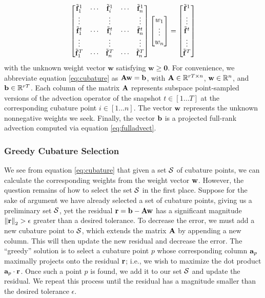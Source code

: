 \begin{equation}
\label{eq:cubature}
\begin{bmatrix}
    \tilde{\mathbf{f}}_{1}^1       & \cdots & \tilde{\mathbf{f}}_{i}^{1} & \cdots & \tilde{\mathbf{f}}_{n}^1\\
    \vdots                 &              & \vdots            &             & \vdots\\
    \tilde{\mathbf{f}}_{1}^{t}     & \cdots  & \tilde{\mathbf{f}}_{i}^{t} & \cdots  & \tilde{\mathbf{f}}_{n}^t\\
    \vdots                 &              & \vdots            &             & \vdots\\
    \tilde{\mathbf{f}}_{1}^T      & \cdots   & \tilde{\mathbf{f}}_{n}^T & \cdots & \tilde{\mathbf{f}}_n^T
\end{bmatrix}
\begin{bmatrix}
	w_1\\
	\vdots\\
	w_n
\end{bmatrix}
=
\begin{bmatrix}
	\tilde{\mathbf{f}}^1\\
	\vdots\\
	\tilde{\mathbf{f}}^t\\
	\vdots\\
	\tilde{\mathbf{f}}^T
\end{bmatrix}
\end{equation}
with the unknown weight vector $\mathbf{w}$ satisfying $\mathbf{w} \geq \mathbf{0}$. For convenience,
we abbreviate equation \ref{eq:cubature} as $\mathbf{A} \mathbf{w} = \mathbf{b}$, with $\mathbf{A} \in \mathbb{R}^{rT \times n}$, $\mathbf{w} \in \mathbb{R}^n$, and $\mathbf{b} \in \mathbb{R}^{rT}$. Each column of the matrix $\mathbf{A}$ represents subspace point-sampled versions 
of the advection operator of the snapshot $t \in [1 \dots T]$ at the corresponding cubature point $i \in [1 \dots n]$. The vector $\mathbf{w}$ represents the unknown nonnegative weights we seek. Finally, the vector $\mathbf{b}$
is a projected full-rank advection computed via equation \ref{eq:fulladvect}.
\subsubsection{Greedy Cubature Selection}
We see from equation \ref{eq:cubature} that given a set $\mathcal{S}$ of cubature points, we can calculate the corresponding weights from the weight vector $\mathbf{w}$. However, the question remains of how to select
the set $\mathcal{S}$ in the first place. Suppose for the sake of argument we have already selected a set of cubature points, giving us a preliminary set $\mathcal{S}$, yet the residual $\mathbf{r} = \mathbf{b} - \mathbf{A} \mathbf{w}$ has a significant
magnitude $\left \lVert \mathbf{r} \right \rVert_2 > \epsilon$ greater than a desired tolerance. To decrease the error, we must add a new cubature point to $\mathcal{S}$, which extends the matrix $\mathbf{A}$ by appending a new column.
This will then update the new residual and decrease the error. The ``greedy'' solution is to select a cubature point $p$ whose corresponding column $\mathbf{a}_p$ maximally projects onto the residual $\mathbf{r}$; i.e., we
wish to maximize the dot product $\mathbf{a}_p \cdot \mathbf{r}$. Once such a point $p$ is found, we add it to our set $\mathcal{S}$ and update the residual. We repeat this process until the residual has a magnitude smaller than
the desired tolerance $\epsilon$. 

